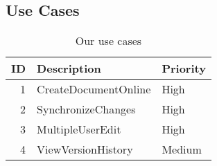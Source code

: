 \subsection{Use Cases}
\begin{table*}[ht]\centering
  \begin{tabularx}{\textwidth}{@{}rXl@{}}\toprule
    \textbf{ID} & \textbf{Description} & \textbf{Priority} \\\hline
    1 & CreateDocumentOnline & High   \\\hline
    2 & SynchronizeChanges   & High   \\\hline
    3 & MultipleUserEdit     & High   \\\hline
    4 & ViewVersionHistory   & Medium \\
    \bottomrule
  \end{tabularx}
  \caption{Our use cases}
  \label{usecases}\centering%
\end{table*}
